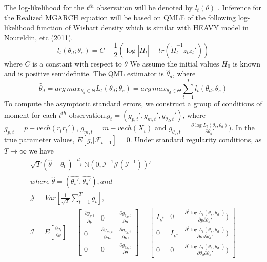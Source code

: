 \documentclass[titlepage,11pt]{article}
\begin{document}
The log-likelihood for the $t^{th}$  observation will be denoted by $l_{t}(\theta)$ . Inference for the Realized MGARCH equation will be based on QMLE of the following log-likelihood function of Wishart density which is similar with HEAVY model in Noureldin, etc (2011).
\begin{equation}
l_{t}(\theta_d;\theta_s) = C-\frac{1}{2}(\log|\tilde{H}_t|+tr(\tilde{H}_t^{-1} z_t z_t'))
\end{equation}
where $C$ is a constant with respect to $\theta$
We assume the initial values $H_0$ is known and is positive semidefinite. 
The QML estimator is $\hat{\theta}_d$, where 
\[\hat{\theta}_d = arg\,max_{\theta_d \in \Theta} L_{t}(\theta_d;\theta_s)=arg\,max_{\theta_d \in \Theta} \sum_{t=1}^{T} l_{t}(\theta_d;\theta_s)\]
To compute the asymptotic standard errors, we construct a group of conditions of moment for each $t^{th}$ observation,$g_t=(g_{p,t}',g_{m,t}',g_{\theta_d,t}')$, where $g_{p,t} = p-vech(r_t r_t')$, $g_{m,t} = m-vech(X_t)$ and $g_{\theta_d,t} =\frac{\partial \log L_{t}(\theta_s,\theta_d)}{\partial \theta_d'}) $. In the true parameter values, $E[g_t|\mathcal{F}_{t-1}]=0$. Under standard regularity conditions, as $T \rightarrow \infty $ we have
\begin{align}
\sqrt{T} (\hat{\theta}-\theta_0) \overset{d}{\rightarrow} \mathbb{N} (0, \mathcal{I}^{-1} \mathcal{J} (\mathcal{I}^{-1}))'\\
where \; \hat{\theta}= (\hat{\theta_s'}, \hat{\theta_d'}), and \nonumber \\
\mathcal{J}=Var \left[\frac{1}{\sqrt{T}} \sum_{t=1}^{T}g_t\right], \\
\mathcal{I}=E \left[\frac{\partial g_t}{\partial \theta}\right]=
\begin{bmatrix} \frac{\partial g_{p,t}}{\partial p} & 0 & \frac{\partial g_{\theta_d,t}}{\partial p} \\ 0 & \frac{\partial g_{m,t}}{\partial m} & \frac{\partial g_{\theta_d,t}}{\partial m} \\ 0 & 0 & \frac{\partial g_{\theta_d,t}}{\partial \theta}\end{bmatrix} =
\begin{bmatrix} I_{k^*} & 0 & \frac{\partial^2 \log L_{t}(\theta_s,\theta_d')}{\partial  p \partial\theta_d'}) \\ 0 & I_{k^*} & \frac{\partial^2 \log L_{t}(\theta_s,\theta_d')}{\partial  m \partial\theta_d'}) \\ 0 & 0 & \frac{\partial^2 \log L_{t}(\theta_s,\theta_d')}{\partial \theta_d  \partial \theta_d'})\end{bmatrix} 
\end{align} 
\end{document}
